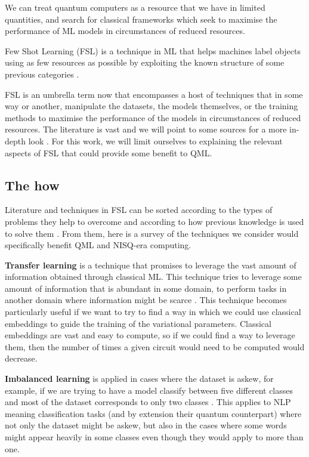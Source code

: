 We can treat quantum computers as a resource that we have in limited quantities, and search for classical frameworks which seek to maximise the performance of ML models in circumstances of reduced resources.

Few Shot Learning (FSL) is a technique in ML that helps machines label objects using as few resources as possible by exploiting the known structure of some previous categories \cite{li_fei-fei_one-shot_2006}.

FSL is an umbrella term now that encompasses a host of techniques that in some way or another, manipulate the datasets, the models themselves, or the training methods to maximise the performance of the models in circumstances of reduced resources. The literature is vast and we will point to some sources for a more in-depth look \cite{parnami_learning_2022}. For this work, we will limit ourselves to explaining the relevant aspects of FSL that could provide some benefit to QML.

\subsection{The how}
Literature and techniques in FSL can be sorted according to the types of problems they help to overcome and according to how previous knowledge is used to solve them \cite{wang_generalizing_2021, liu_embedding_2022}. From them, here is a survey of the techniques we consider would specifically benefit QML and NISQ-era computing.

\textbf{Transfer learning} is a technique that promises to leverage the vast amount of information obtained through classical ML. This technique tries to leverage some amount of information that is abundant in some domain, to perform tasks in another domain where information might be scarce \cite{pan_survey_2010,niu_decade_2020,zhuang_comprehensive_2021}. This technique becomes particularly useful if we want to try to find a way in which we could use classical embeddings to guide the training of the variational parameters. Classical embeddings are vast and easy to compute, so if we could find a way to leverage them, then the number of times a given circuit would need to be computed would decrease.

\textbf{Imbalanced learning} is applied in cases where the dataset is askew, for example, if we are trying to have a model classify between five different classes and most of the dataset corresponds to only two classes \cite{herbelot_high-risk_2017,haibo_he_learning_2009}. This applies to NLP meaning classification tasks (and by extension their quantum counterpart) where not only the dataset might be askew, but also in the cases where some words might appear heavily in some classes even though they would apply to more than one.

